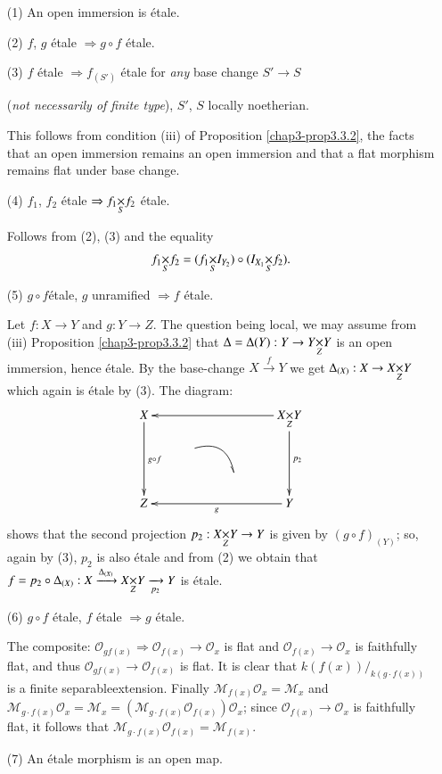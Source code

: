 \begin{itemize}
\item[(1)] An open immersion is \'etale.

\item[(2)] $f$, $g$ \'etale $\Rightarrow g\circ f$ \'etale.

\item[(3)] $f$ \'etale $\Rightarrow f_{(S')}$ \'etale for {\em any}
  base change $S'\to S$

({\em not necessarily of finite type}), $S'$, $S$ locally noetherian.

This follows from condition (iii) of Proposition \ref{chap3-prop3.3.2}, the
facts that an open immersion remains an open immersion and that a flat
morphism remains flat under base change.

\item[(4)] $f_{1}$, $f_{2}$ \'etale $\Rightarrow
  \fprod{f_{1}}{f_{2}}{S}$ \'etale. 


Follows from (2), (3) and the equality
$$
\fprod{f_{1}}{f_{2}}{S}=(\fprod{f_{1}}{I_{Y_{2}}}{S})\circ
(\fprod{I_{X_{1}}}{f_{2}}{S}). 
$$

\item[(5)] $g\circ f$\pageoriginale \'etale, $g$ unramified $\Rightarrow f$
  \'etale.

Let $f:X\to Y$ and $g:Y\to Z$. The question being local, we may assume
from (iii) Proposition \ref{chap3-prop3.3.2} that $\Delta=\Delta(Y):Y\to
\fprod{Y}{Y}{Z}$ is an open immersion, hence \'etale. By the
base-change $X\xrightarrow{f}{Y}$ we get $\Delta_{(X)}:X\to
\fprod{X}{Y}{Z}$ which again is \'etale by (3). The diagram:
\[
\xymatrix@R=.5cm@C=1cm{
X\ar[ddd]^{g\circ f} & & & \ar[lll] \fprod{X}{Y}{Z}\ar[ddd]^{p_{2}}\\
 & \ar@/^1pc/@{-_{>}}[dr] & & \\
 & & & \\
Z\ar@{<-}[rrr]_{g} & && Y
}
\]
shows that the second projection $p_{2}:\fprod{X}{Y}{Z}\to Y$ is given
by $(g\circ f)_{(Y)}$; so, again by (3), $p_{2}$ is also \'etale and
from (2) we obtain that $f=p_{2}\circ
\Delta_{(X)}:X\xrightarrow{\Delta_{(X)}}\fprod{X}{Y}{Z}\xrightarrow[p_{2}]{}Y$
is \'etale.

\item[(6)] $g\circ f$ \'etale, $f$ \'etale $\Rightarrow g$ \'etale.


The composite: $\mathscr{O}_{gf(x)}\Rightarrow\mathscr{O}_{f(x)}\to
\mathscr{O}_{x}$ is flat and $\mathscr{O}_{f(x)}\to \mathscr{O}_{x}$
is faithfully flat, and thus $\mathscr{O}_{gf(x)}\to
\mathscr{O}_{f(x)}$ is flat. It is clear that $k(f(x))/_{k(g\cdot
  f(x))}$ is a finite separable\pageoriginale extension. Finally
$\mathscr{M}_{f(x)}\mathscr{O}_{x}=\mathscr{M}_{x}$ and
$\mathscr{M}_{g\cdot
  f(x)}\mathscr{O}_{x}=\mathscr{M}_{x}=(\mathscr{M}_{g\cdot
  f(x)}\mathscr{O}_{f(x)})\mathscr{O}_{x}$; since
$\mathscr{O}_{f(x)}\to \mathscr{O}_{x}$ is faithfully flat, it follows
that $\mathscr{M}_{g\cdot f(x)}\mathscr{O}_{f(x)}=\mathscr{M}_{f(x)}$.

\item[(7)] An \'etale morphism is an open map.
\end{itemize}

